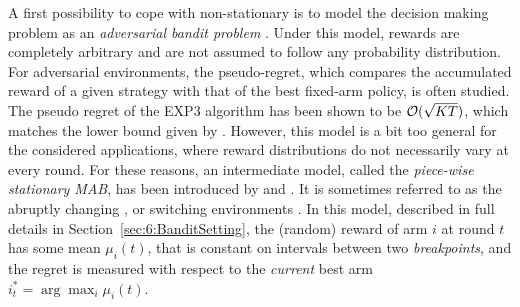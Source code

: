A first possibility to cope with non-stationary is to model the decision making problem as an \emph{adversarial bandit problem} \cite{Auer02NonStochastic}. Under this model, rewards are completely arbitrary and are not assumed to follow any probability distribution.
For adversarial environments, the pseudo-regret, which compares the accumulated reward of a given strategy with that of the best fixed-arm policy, is often studied. The pseudo regret of the EXP3 algorithm has been shown to be $\mathcal{O}(\sqrt{KT})$, which matches the lower bound given by \cite{Auer02NonStochastic}. However, this model is a bit too general for the considered applications, where reward distributions do not necessarily vary at every round. For these reasons, an intermediate model, called the \emph{piece-wise stationary MAB}, has been introduced by \cite{Kocsis06} and \cite{YuMannor09}.
It is sometimes referred to as the abruptly changing \cite{WeiSrivastava18Abruptly}, or switching environments \cite{MellorShapiro13}.
%
In this model, described in full details in Section~\ref{sec:6:BanditSetting}, the (random) reward of arm $i$ at round $t$ has some mean $\mu_i(t)$, that is constant on intervals between two \emph{breakpoints}, and the regret is measured with respect to the \emph{current} best arm $i_t^* = \arg\max_{i} \mu_i(t)$.



